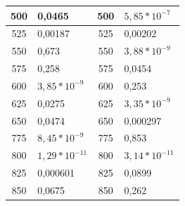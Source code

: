 \documentclass[a4paper,twoside,openright,12pt,slovene]{book}
\begin{document}
\begin{longtable}{| p{} | p{} | p{} | p{} |}
\multicolumn{1}{|c|}{500}                  & \color[HTML]{036400}0,0465                           & \multicolumn{1}{c|}{500}                  & \color[HTML]{036400}$5,85*10^{-7}$                      \\ \hline
\multicolumn{1}{|c|}{525}                  & \color[HTML]{036400}0,00187                          & \multicolumn{1}{c|}{525}                  & \color[HTML]{036400}0,00202                          \\ \hline
\multicolumn{1}{|c|}{550}                  & \cellcolor{lime}0,673                            & \multicolumn{1}{c|}{550}                  & \color[HTML]{036400}$3,88*10^{-9}$                     \\ \hline
\multicolumn{1}{|c|}{575}                  & \cellcolor{lime}0,258                            & \multicolumn{1}{c|}{575}                  & \color[HTML]{036400}0,0454                           \\ \hline
\multicolumn{1}{|c|}{600}                  & \color[HTML]{CE6301}$3,85*10^{-9}$                     & \multicolumn{1}{c|}{600}                  & \cellcolor{lime}0,253                            \\ \hline
\multicolumn{1}{|c|}{625}                  & \color[HTML]{CE6301}0,0275                           & \multicolumn{1}{c|}{625}                  & \color[HTML]{CE6301}$3,35*10^{-9}$                     \\ \hline
\multicolumn{1}{|c|}{650}                  & \color[HTML]{CE6301}0,0474                           & \multicolumn{1}{c|}{650}                  & \color[HTML]{CE6301}0,000297                         \\ \hline
\multicolumn{1}{|c|}{775}                  & \color[HTML]{CE6301}$8,45*10^{-9}$                     & \multicolumn{1}{c|}{775}                  & \cellcolor{lime}0,853                            \\ \hline
\multicolumn{1}{|c|}{800}                  & \color[HTML]{CE6301}$1,29*10^{-11}$                    & \multicolumn{1}{c|}{800}                  & \color[HTML]{CE6301}$3,14*10^{-11}$                    \\ \hline
\multicolumn{1}{|c|}{825}                  & \color[HTML]{CE6301}0,000601                         & \multicolumn{1}{c|}{825}                  & \color[HTML]{CE6301}0,0899                           \\ \hline
\multicolumn{1}{|c|}{850}                  & \color[HTML]{CE6301}0,0675                           & \multicolumn{1}{c|}{850}                  & \cellcolor{lime}0,262                            \\ \hline

\end{longtable}
\end{document}
